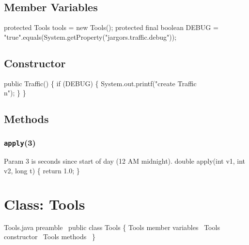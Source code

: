 \section{Member Variables}
\nwenddocs{}\endmoddef{}
protected Tools tools = new Tools();
protected final boolean DEBUG = "true".equals(System.getProperty("jargors.traffic.debug"));
\nwendcode{}\nwdocspar


\section{Constructor}
\nwenddocs{}\endmoddef{}
public Traffic() \{
  if (DEBUG) \{
    System.out.printf("create Traffic\\n");
  \}
\}
\nwendcode{}\nwdocspar

\section{Methods}

\subsection{\texttt{apply}(3)}
Param 3 is seconds since start of day (12 AM midnight).
\nwenddocs{}\endmoddef{}
double apply(int v1, int v2, long t) \{
  return 1.0;
\}
\eatline
{}\nwendcode{}\nwdocspar
\nwenddocs{}\chapter{Class: Tools}
\label{tools}

\nwenddocs{}\endmoddef{}
\LA{}Tools.java preamble~{\nwtagstyle{}}\RA{}
public class Tools \{
  \LA{}\code{}Tools\edoc{} member variables~{\nwtagstyle{}}\RA{}
  \LA{}\code{}Tools\edoc{} constructor~{\nwtagstyle{}}\RA{}
  \LA{}\code{}Tools\edoc{} methods~{\nwtagstyle{}}\RA{}
\}
\nwendcode{}\nwdocspar


